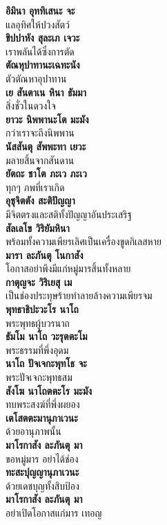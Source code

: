 \documentclass[12pt]{article}
\begin{document}
\textbf{อิมินา อุททิเสนะ จะ}\\
\indent แลอุทิศให้ปวงสัตว์\\
\textbf{ขิปปาหัง สุละเภ เจวะ}\\
\indent เราพลันได้ซึ่งการตัด\\
\textbf{ตัณหุปาทานะเฉทะนัง}\\
\indent ตัวตัณหาอุปาทาน\\
\textbf{เย สันตาเน หินา ธัมมา}\\
\indent สิ่งชั่วในดวงใจ\\
\textbf{ยาวะ นิพพานะโต มะมัง}\\
\indent กว่าเราจะถึงนิพพาน\\
\textbf{นัสสันตุ สัพพะทา เยวะ}\\
\indent มลายสิ้นจากสันดาน\\
\textbf{ยัตถะ ชาโต ภะเว ภะเว}\\
\indent ทุกๆ ภพที่เราเกิด\\
\textbf{อุชุจิตตัง สะติปัญญา}\\
\indent มีจิตตรงและสติทั้งปัญญาอันประเสริฐ\\
\textbf{สัลเลโข วิริยัมหินา}\\
\indent พร้อมทั้งความเพียรเลิศเป็นเครื่องขูดกิเลสหาย\\
\textbf{มารา ละภันตุ โนกาสัง}\\
\indent โอกาสอย่าพึงมีแก่หมู่มารสิ้นทั้งหลาย\\
\textbf{กาตุญจะ วิริเยสุ เม}\\
\indent เป็นช่องประทุษร้ายทำลายล้างความเพียรจม\\
\textbf{พุทธาธิปะวะโร นาโถ}\\
\indent พระพุทธผู้บวรนาถ\\
\textbf{ธัมโม นาโถ วะรุตตะโม}\\
\indent พระธรรมที่พึ่งอุดม\\
\textbf{นาโถ ปัจเจกะพุทโธ จะ}\\
\indent พระปัจเจกะพุทธสม\\
\textbf{สังโฆ นาโถตตะโร มะมัง}\\
\indent ทบพระสงฆ์ที่พึ่งผยอง\\
\textbf{เตโสตตะมานุภาเวนะ}\\
\indent ด้วยอานุภาพนั้น\\
\textbf{มาโรกาสัง ละภันตุ มา}\\
\indent ขอหมู่มาร อย่าได้ช่อง\\
\textbf{ทะสะปุญญานุภาเวนะ}\\
\indent ด้วยเดชบุญทั้งสิบป้อง\\
\textbf{มาโรกาสัง ละภันตุ มา}\\
\indent อย่าเปิดโอกาสแก่มาร เทอญ\\

\pagebreak
\vspace*{\fill}
\begin{center}
\end{center}
\vspace{\fill}
\pagebreak
\end{document}
